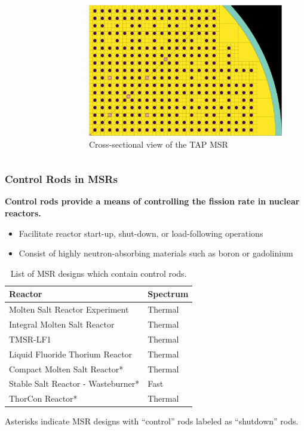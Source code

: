 \begin{frame}
\begin{columns}
\begin{figure}
    \end{figure}
    \begin{figure}
      \centering
      \includegraphics[width=.5\columnwidth]{images/tap-msr-rods}
      \caption{\footnotesize Cross-sectional view of the TAP MSR \cite{lee_neutronics_2020}}
    \end{figure}
    \hfill
  \end{columns}
\end{frame}

\begin{frame}
  \frametitle{Control Rods in MSRs}
  \textbf{Control rods provide a means of controlling the fission rate in nuclear reactors.} 
  \begin{itemize}
    \item Facilitate reactor start-up, shut-down, or load-following operations
    \item Consist of highly neutron-absorbing materials such as boron or gadolinium
  \end{itemize}
  \begin{table}
    \centering
    \footnotesize
    \caption{List of MSR designs which contain control rods.}
    \begin{tabular}{l l}
      \toprule
      Reactor & Spectrum \\
      \midrule
      Molten Salt Reactor Experiment & Thermal \\
      Integral Molten Salt Reactor & Thermal \\
      TMSR-LF1 & Thermal \\
      Liquid Fluoride Thorium Reactor & Thermal \\
      Compact Molten Salt Reactor* & Thermal \\
      Stable Salt Reactor - Wasteburner* & Fast \\
      ThorCon Reactor* & Thermal \\
      \bottomrule
    \end{tabular}
  \end{table}
  Asterisks indicate MSR designs with ``control'' rods labeled as ``shutdown'' rods.
\end{frame}

